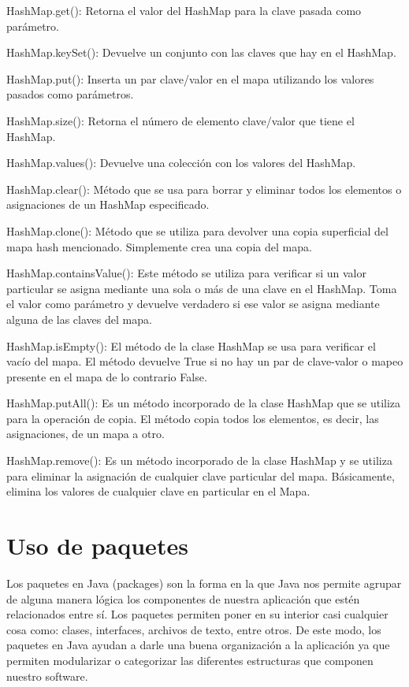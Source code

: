 \documentclass[12pt,a4paper]{report}
\begin{document}
{HashMap.get(): Retorna el valor del HashMap para la clave pasada como parámetro.

HashMap.keySet(): Devuelve un conjunto con las claves que hay en el HashMap.

HashMap.put(): Inserta un par clave/valor en el mapa utilizando los valores pasados como parámetros.

HashMap.size(): Retorna el número de elemento clave/valor que tiene el HashMap.

HashMap.values(): Devuelve una colección con los valores del HashMap.

HashMap.clear(): Método que se usa para borrar y eliminar todos los elementos o asignaciones de un HashMap especificado.

HashMap.clone(): Método que se utiliza para devolver una copia superficial del mapa hash mencionado. Simplemente crea una copia del mapa.

HashMap.containsValue(): Este método se utiliza para verificar si un valor particular se asigna mediante una sola o más de una clave en el HashMap. Toma el valor como parámetro y devuelve verdadero si ese valor se asigna mediante alguna de las claves del mapa.

HashMap.isEmpty(): El método de la clase HashMap se usa para verificar el vacío del mapa. El método devuelve True si no hay un par de clave-valor o mapeo presente en el mapa de lo contrario False.

HashMap.putAll(): Es un método incorporado de la clase HashMap que se utiliza para la operación de copia. El método copia todos los elementos, es decir, las asignaciones, de un mapa a otro.

HashMap.remove(): Es un método incorporado de la clase HashMap y se utiliza para eliminar la asignación de cualquier clave particular del mapa. Básicamente, elimina los valores de cualquier clave en particular en el Mapa.

\section*{Uso de paquetes}
Los paquetes en Java (packages) son la forma en la que Java nos permite agrupar de alguna manera lógica los componentes de nuestra aplicación que estén relacionados entre sí.
Los paquetes permiten poner en su interior casi cualquier cosa como: clases, interfaces, archivos de texto, entre otros. De este modo, los paquetes en Java ayudan a darle una buena organización a la aplicación ya que permiten modularizar o categorizar las diferentes estructuras que componen nuestro software.
}
\end{document}
